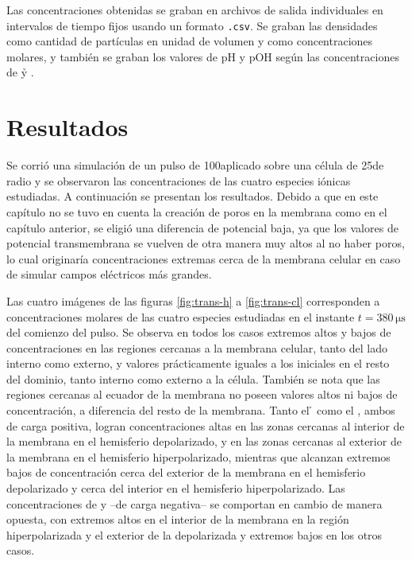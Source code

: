 Las concentraciones obtenidas se graban en archivos de salida individuales en intervalos de tiempo fijos usando un formato \texttt{.csv}. Se graban las densidades como cantidad de partículas en unidad de volumen y como concentraciones molares, y también se graban los valores de pH y pOH según las concentraciones de \h y \oh. 


\section{Resultados}

Se corrió una simulación de un pulso de 100\vcm aplicado sobre una célula de 25\um de radio y se observaron las concentraciones de las cuatro especies iónicas estudiadas. A continuación se presentan los resultados. Debido a que en este capítulo no se tuvo en cuenta la creación de poros en la membrana como en el capítulo anterior, se eligió una diferencia de potencial baja, ya que los valores de potencial transmembrana se vuelven de otra manera muy altos al no haber poros, lo cual originaría concentraciones extremas cerca de la membrana celular en caso de simular campos eléctricos más grandes.



Las cuatro imágenes de las figuras \ref{fig:trans-h} a \ref{fig:trans-cl} corresponden a concentraciones molares de las cuatro especies estudiadas en el instante $t = 380 \, \si{\micro\second}$ del comienzo del pulso. Se observa en todos los casos extremos altos y bajos de concentraciones en las regiones cercanas a la membrana celular, tanto del lado interno como externo, y valores prácticamente iguales a los iniciales en el resto del dominio, tanto interno como externo a la célula. También se nota que las regiones cercanas al ecuador de la membrana no poseen valores altos ni bajos de concentración, a diferencia del resto de la membrana. Tanto el \h{} como el \na, ambos de carga positiva, logran concentraciones altas en las zonas cercanas al interior de la membrana en el hemisferio depolarizado, y en las zonas cercanas al exterior de la membrana en el hemisferio hiperpolarizado, mientras que alcanzan extremos bajos de concentración cerca del exterior de la membrana en el hemisferio depolarizado y cerca del interior en el hemisferio hiperpolarizado. Las concentraciones de \oh{} y \cl{} --de carga negativa-- se comportan en cambio de manera opuesta, con extremos altos en el interior de la membrana en la región hiperpolarizada y el exterior de la depolarizada y extremos bajos en los otros casos. 

